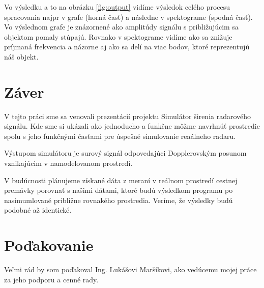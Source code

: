 \documentclass[slovak]{ExcelAtFIT} %
\begin{document}
    Vo výsledku a to na obrázku \ref{fig:output} vidíme výsledok celého procesu spracovania najpr v grafe (horná časť) a následne v spektograme (spodná časť). Vo výslednom grafe je znázornené ako amplitúdy signálu s približujú\-cim sa objektom pomaly stúpajú. Rovnako v spektograme vidíme ako sa znižuje príjmaná frekvencia a názorne aj ako sa delí na viac bodov, ktoré reprezentujú náš objekt.

\section{Záver}
\label{sec:Conclusions}

\hspace{0.6cm}V tejto práci sme sa venovali prezentácií projektu Simulátor širenia radarového signálu. Kde sme si ukázali ako jednoducho a funkčne môžme navrhnúť prostredie spolu s jeho funkčnými časťami pre úspešné simulovanie reaálneho radaru.

Výstupom simulátoru je surový signál odpovedajúci Dopplerovským posunom vznikajúcim v namodelovanom prostredí.

V budúcnosti plánujeme získané dáta z meraní v reálnom prostredí cestnej premávky porovnať s našimi dátami, ktoré budú výsledkom programu po nasimumlované približne rovnakého prostredia. Veríme, že výsled\-ky budú podobné až identické.

\section*{Poďakovanie}
\hspace{0.6cm}Veľmi rád by som poďakoval Ing. Lukášovi Marší\-kovi, ako vedúcemu mojej práce za jeho podporu a cenné rady.



\end{document}
